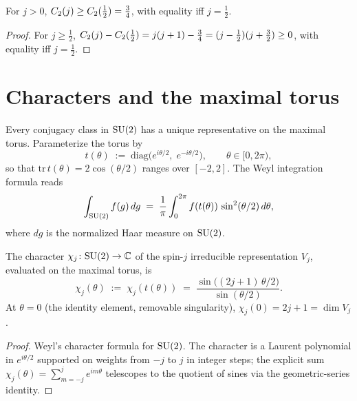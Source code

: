 \begin{lemma}
\label{lem:spectral-gap}
For $j > 0$, $C_2(j) \ge C_2(\tfrac12) = \tfrac34$, with
equality iff $j = \tfrac12$.
\end{lemma}

\begin{proof}
For $j \ge \tfrac12$, $C_2(j) - C_2(\tfrac12) = j(j+1) -
\tfrac34 = (j - \tfrac12)(j + \tfrac32) \ge 0$, with equality iff
$j = \tfrac12$.
\end{proof}

\section{Characters and the maximal torus}
\label{sec:characters}

Every conjugacy class in $\mathrm{SU}(2)$ has a unique representative on the
maximal torus.  Parameterize the torus by
\begin{equation}
  \label{eq:torus-element}
  t(\theta) \;:=\; \mathrm{diag}\bigl(e^{i\theta/2},\; e^{-i\theta/2}\bigr),
  \qquad \theta \in [0, 2\pi),
\end{equation}
so that $\mathrm{tr}\, t(\theta) = 2\cos(\theta/2)$ ranges over
$[-2, 2]$.  The Weyl integration formula reads
\begin{equation}
  \label{eq:weyl-integration}
  \int_{\mathrm{SU}(2)} f(g)\, dg
  \;=\; \frac{1}{\pi} \int_0^{2\pi} f(t(\theta))\, \sin^2(\theta/2)\, d\theta ,
\end{equation}
where $dg$ is the normalized Haar measure on $\mathrm{SU}(2)$.

\begin{theorem}
\label{thm:character}
The character $\chi_j \colon \mathrm{SU}(2) \to \mathbb{C}$ of the spin-$j$
irreducible representation $V_j$, evaluated on the maximal torus, is
\begin{equation}
  \label{eq:character-formula}
  \chi_j(\theta) \;:=\; \chi_j(t(\theta))
  \;=\; \frac{\sin\bigl((2j+1)\,\theta/2\bigr)}{\sin(\theta/2)} .
\end{equation}
At $\theta = 0$ (the identity element, removable singularity),
$\chi_j(0) = 2j + 1 = \dim V_j$.
\end{theorem}

\begin{proof}
Weyl's character formula for $\mathrm{SU}(2)$.  The character is a Laurent
polynomial in $e^{i\theta/2}$ supported on weights from $-j$ to $j$
in integer steps; the explicit sum
$\chi_j(\theta) = \sum_{m = -j}^{j} e^{im\theta}$ telescopes to the
quotient of sines via the geometric-series identity.
\end{proof}

